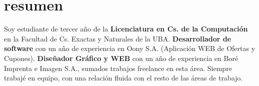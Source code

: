 \documentclass[espanol]{cv-style}     %
\begin{document}
\section{resumen}
  \vspace{-0.2cm}
Soy estudiante de tercer año de la \textbf{Licenciatura en Cs. de la Computación} en la Facultad de Cs. Exactas y Naturales de la UBA. \textbf{Desarrollador de software} con un año de experiencia en Oony S.A. (Aplicación WEB de Ofertas y Cupones). \textbf{Diseñador Gráfico y WEB} con un año de experiencia en Boré Imprenta e Imagen S.A., sumados trabajos freelance en esta área. Siempre trabajé en equipo, con una relación fluida con el resto de las áreas de trabajo.
\end{document}
